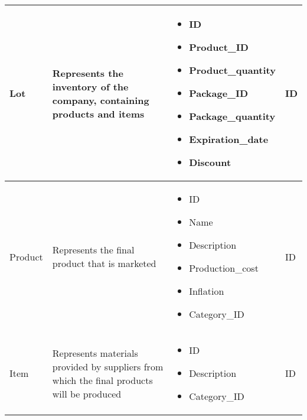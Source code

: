 \begin{longtable}{|p{}|p{} |p{}|p{} |}
    Lot & Represents the inventory of the company, containing products and items &
    \begin{itemize}
        \vspace{-1em}
        \item ID
        \item Product\_ID
        \item Product\_quantity
        \item Package\_ID
        \item Package\_quantity
        \item Expiration\_date
        \item Discount      %
    \end{itemize}
    &  ID \\\hline


    Product & Represents the final product that is marketed &
    \begin{itemize}
        \vspace{-1em}
        \item ID
        \item Name
        \item Description
        \item Production\_cost      %
        \item Inflation             %
        \item Category\_ID
    \end{itemize}
    &  ID \\\hline

    Item & Represents materials provided by suppliers from which the final products will be produced &
    \begin{itemize}
        \vspace{-1em}
        \item ID
        \item Description
        \item Category\_ID
    \end{itemize}
    &  ID \\\hline


\end{longtable}
